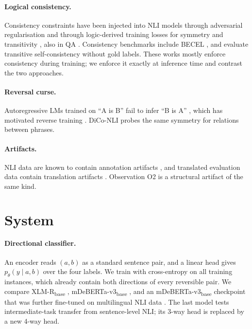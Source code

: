 \paragraph{Logical consistency.} Consistency constraints have been injected into NLI models through adversarial regularisation \citep{minervini2018adversarially} and through logic-derived training losses for symmetry and transitivity \citep{li2019logic}, also in QA \citep{asai2020logic}. Consistency benchmarks include BECEL \citep{jang2022becel}, and \citet{wu2025transitive} evaluate transitive self-consistency without gold labels. These works mostly enforce consistency during training; we enforce it exactly at inference time and contrast the two approaches.
\paragraph{Reversal curse.} Autoregressive LMs trained on ``A is B'' fail to infer ``B is A'' \citep{berglund2024reversal,lin2024delving}, which has motivated reverse training \citep{golovneva2024reverse}. DiCo-NLI probes the same symmetry for relations between phrases.
\paragraph{Artifacts.} NLI data are known to contain annotation artifacts \citep{gururangan2018annotation}, and translated evaluation data contain translation artifacts \citep{artetxe2020translation}. Observation O2 is a structural artifact of the same kind.

\section{System}
\label{sec:method}

\paragraph{Directional classifier.} An encoder reads $(a,b)$ as a standard sentence pair, and a linear head gives $p_\theta(y \mid a,b)$ over the four labels. We train with cross-entropy on all training instances, which already contain both directions of every reversible pair. We compare XLM-R\textsubscript{base} \citep{conneau2020unsupervised}, mDeBERTa-v3\textsubscript{base} \citep{he2023debertav3}, and an mDeBERTa-v3\textsubscript{base} checkpoint that was further fine-tuned on multilingual NLI data \citep[XNLI and machine-translated English NLI corpora;][]{conneau2018xnli,laurer2024less}. The last model tests intermediate-task transfer from sentence-level NLI; its 3-way head is replaced by a new 4-way head.

